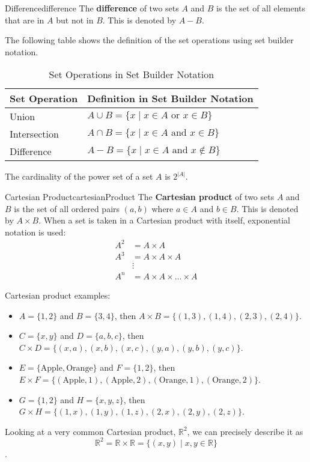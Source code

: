\begin{definition}{Difference}{difference}
  The \textbf{difference} of two sets \( A \) and \( B \) is the set of all 
  elements that are in \( A \) but not in \( B \). This is denoted by \( A - B \).
\end{definition}

The following table shows the definition of the set operations using set builder notation.
\begin{table}[H]
  \centering
  \begin{tabular}{p{1in} p{3in}}
    \toprule
    \textbf{Set Operation} & \textbf{Definition in Set Builder Notation} \\
    \midrule
    Union & \( A \cup B = \{ x \mid x \in A \text{ or } x \in B \} \) \\
    Intersection & \( A \cap B = \{ x \mid x \in A \text{ and } x \in B \} \) \\
    Difference & \( A - B = \{ x \mid x \in A \text{ and } x \notin B \} \) \\
    \bottomrule
  \end{tabular}
  \caption{Set Operations in Set Builder Notation}
\end{table}

The cardinality of the power set of a set \( A \) is \( 2^{|A|} \).

\begin{definition}{Cartesian Product}{cartesianProduct}
  The \textbf{Cartesian product} of two sets \( A \) and \( B \) is the set of all 
  ordered pairs \( (a, b) \) where \( a \in A \) and \( b \in B \). This is denoted by 
  \( A \times B \).
  \medskip
  When a set is taken in a Cartesian product with itself, exponential notation is used:
  \begin{align*}
    A^2 &= A \times A \\
    A^3 &= A \times A \times A \\
    &\vdots \\
    A^n &= A \times A \times \ldots \times A
  \end{align*}
\end{definition}
Cartesian product examples:
\begin{itemize}
  \item \( A = \{ 1, 2 \} \) and \( B = \{ 3, 4 \} \), then 
    \( A \times B = \{ (1, 3), (1, 4), (2, 3), (2, 4) \} \).
  \item \( C = \{ x, y \} \) and \( D = \{ a, b, c \} \), 
    then \( C \times D = \{ (x, a), (x, b), (x, c), (y, a), (y, b), (y, c) \} \).
  \item \( E = \{ \text{Apple}, \text{Orange} \} \) 
     and \( F = \{ 1, 2 \} \), then \\
     \( E \times F = \{ (\text{Apple}, 1), (\text{Apple}, 2), (\text{Orange}, 1), (\text{Orange}, 2) \} \).
  \item \( G = \{ 1, 2 \} \) and \( H = \{ x, y, z \} \), then \( G \times H = \{ (1, x), (1, y), (1, z), (2, x), (2, y), (2, z) \} \).
\end{itemize}

Looking at a very common Cartesian product, \( \mathbb{R}^2 \), we can precisely describe it
as 
\[ 
  \mathbb{R}^2 = \mathbb{R} \times \mathbb{R} = \{ (x, y) \mid x, y \in \mathbb{R} \} 
\].
